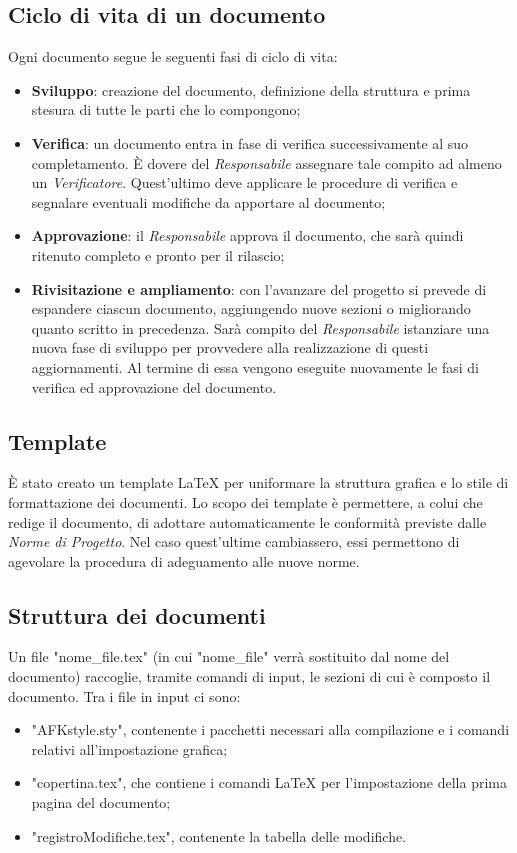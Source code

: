 \subsection{Ciclo di vita di un documento}
Ogni documento segue le seguenti fasi di ciclo di vita:
\begin{itemize}
\item \textbf{Sviluppo}: creazione del documento, definizione della struttura e prima stesura di tutte le parti che lo compongono;
\item \textbf{Verifica}: un documento entra in fase di verifica successivamente al suo completamento. È dovere del \textit{Responsabile} assegnare tale compito ad almeno un \textit{Verificatore}. Quest'ultimo deve applicare le procedure di verifica e segnalare eventuali modifiche da apportare al documento;
\item \textbf{Approvazione}: il \textit{Responsabile} approva il documento, che sarà quindi ritenuto completo e pronto per il rilascio;
\item \textbf{Rivisitazione e ampliamento}: con l'avanzare del progetto si prevede di espandere ciascun documento, aggiungendo nuove sezioni o migliorando quanto scritto in precedenza. Sarà compito del \textit{Responsabile} istanziare una nuova fase di sviluppo per provvedere alla realizzazione di questi aggiornamenti. Al termine di essa vengono eseguite nuovamente le fasi di verifica ed approvazione del documento.
\end{itemize}

\subsection{Template}
È stato creato un template \LaTeX{} per uniformare la struttura grafica e lo stile di formattazione dei documenti. Lo scopo dei template è permettere, a colui che redige il documento, di adottare automaticamente le conformità previste dalle \textit{Norme di Progetto}. Nel caso quest'ultime cambiassero, essi permettono di agevolare la procedura di adeguamento alle nuove norme.

\subsection{Struttura dei documenti}
Un file "nome\_file.tex" (in cui "nome\_file" verrà sostituito dal nome del documento) raccoglie, tramite comandi di input, le sezioni di cui è composto il documento. Tra i file in input ci sono:
\begin{itemize}
\item "AFKstyle.sty", contenente i pacchetti necessari alla compilazione e i comandi relativi all'impostazione grafica;
\item "copertina.tex", che contiene i comandi \LaTeX{} per l'impostazione della prima pagina del documento;
\item "registroModifiche.tex", contenente la tabella delle modifiche.
\end{itemize}

